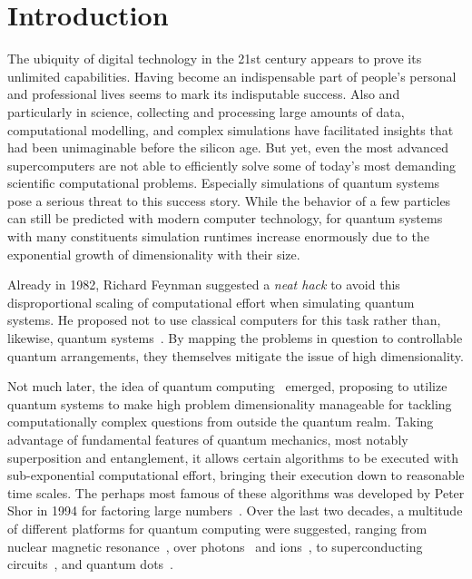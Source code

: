 \renewcommand{\imagepath}{../10-intro/img}

\chapter{Introduction}
The ubiquity of digital technology in the 21st century appears to prove its unlimited capabilities. Having become an indispensable part of people's personal and professional lives seems to mark its indisputable success. Also and particularly in science, collecting and processing large amounts of data, computational modelling, and complex simulations have facilitated insights that had been unimaginable before the silicon age. But yet, even the most advanced supercomputers are not able to efficiently solve some of today's most demanding scientific computational problems. Especially simulations of quantum systems pose a serious threat to this success story. While the behavior of a few particles can still be predicted with modern computer technology, for quantum systems with many constituents simulation runtimes increase enormously due to the exponential growth of dimensionality with their size.

Already in 1982, Richard Feynman suggested a \textit{neat hack} to avoid this disproportional scaling of computational effort when simulating quantum systems. He proposed not to use classical computers for this task rather than, likewise, quantum systems~\cite{feynman_simulating_1982}. By mapping the problems in question to controllable quantum arrangements, they themselves mitigate the issue of high dimensionality.

Not much later, the idea of quantum computing~\cite{nielsen_quantum_2010, hidary_quantum_2021, ladd_quantum_2010, mainzer_quantencomputer_2020} emerged, proposing to utilize quantum systems to make high problem dimensionality manageable for tackling computationally complex questions from outside the quantum realm. Taking advantage of fundamental features of quantum mechanics, most notably superposition and entanglement, it allows certain algorithms to be executed with sub-exponential computational effort, bringing their execution down to reasonable time scales. The perhaps most famous of these algorithms was developed by Peter Shor in 1994 for factoring large numbers~\cite{shor_algorithms_1994}. Over the last two decades, a multitude of different platforms for quantum computing were suggested, ranging from nuclear magnetic resonance~\cite{cory_ensemble_1997}, over photons~\cite{duan_scalable_2004,zhong_quantum_2020} and ions~\cite{home_complete_2009}, to superconducting circuits~\cite{dicarlo_demonstration_2009, arute_quantum_2019-1}, and quantum dots~\cite{hanson_spins_2007}.

